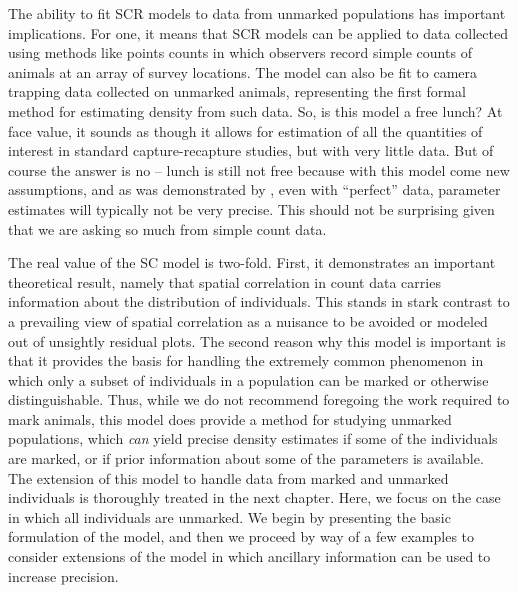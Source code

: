 The ability to fit SCR models to data from unmarked populations has
important implications. For one, it means that SCR models can
be applied to data collected using methods like points counts in which
observers record simple counts of animals at an array of survey
locations. The model can also be fit to camera trapping data collected on
unmarked animals, representing the first formal method for estimating
density from such data.
So, is this model a free lunch? At face value, it sounds as though it
allows for estimation of
all the quantities of interest in standard
capture-recapture studies, but with very little
data. But of course the answer is no --
lunch is still not free because
with this model come new assumptions,
and as was demonstrated by
\citet{chandler_royle:2012}, even with ``perfect'' data, parameter estimates
will typically not be very precise. %
This should
not be surprising given that we are asking so much from simple count
data.

The real value of the SC model is two-fold. First, it demonstrates
an important theoretical result, namely
that spatial correlation in
count data carries information about the distribution 
of
individuals. This stands in stark contrast to a prevailing view of
spatial correlation as a nuisance to be avoided or modeled out of unsightly
residual plots. The second reason why this model is important is that
it provides the basis for handling the extremely common phenomenon in
which only a subset of individuals in a population can be marked or otherwise
distinguishable. Thus, while we do not recommend foregoing the work
required to mark animals, this model does provide a method for
studying unmarked populations, which \textit{can} yield precise
density estimates if some of the individuals are marked, or if prior
information about some of the parameters is available.
The extension of this model to handle data from marked and unmarked
individuals is thoroughly treated in the next chapter. Here, we focus
on the case in which all individuals are unmarked. We begin by
presenting the basic formulation of the model, and then we proceed by
way of a few examples to consider extensions of the model in which
ancillary information can be used to increase precision.

